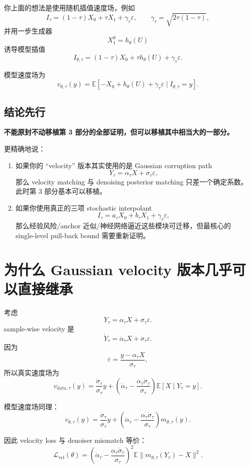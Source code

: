 \documentclass[UTF8,11pt]{ctexart}
\newcommand{\E}{\mathbb{E}}
\begin{document}
你上面的想法是使用随机插值速度场，例如
\[
I_\tau
=
(1-\tau)X_0+\tau X_1+\gamma_\tau\varepsilon,
\qquad
\gamma_\tau=\sqrt{2\tau(1-\tau)},
\]
并用一步生成器
\[
X_1^\theta=h_\theta(U)
\]
诱导模型插值
\[
I_{\theta,\tau}
=
(1-\tau)X_0+\tau h_\theta(U)+\gamma_\tau\varepsilon.
\]

模型速度场为
\[
v_{\theta,\tau}(y)
=
\E\left[
-X_0+h_\theta(U)+\dot\gamma_\tau\varepsilon
\mid I_{\theta,\tau}=y
\right].
\]

\subsection{结论先行}

\textbf{不能原封不动移植第 3 部分的全部证明，但可以移植其中相当大的一部分。}

更精确地说：
\begin{enumerate}
\item 如果你的 ``velocity'' 版本其实使用的是 Gaussian corruption path
\[
Y_\tau=\alpha_\tau X+\sigma_\tau\varepsilon,
\]
那么 velocity matching 与 denoising posterior matching 只差一个确定系数。此时第 3 部分基本可以移植。
\item 如果你使用真正的三项 stochastic interpolant
\[
I_\tau=a_\tau X_0+b_\tau X_1+\gamma_\tau\varepsilon,
\]
那么经验风险/anchor 近似/神经网络逼近这些模块可迁移，但最核心的 single-level pull-back bound 需要重新证明。
\end{enumerate}

\section{为什么 Gaussian velocity 版本几乎可以直接继承}

考虑
\[
Y_\tau=\alpha_\tau X+\sigma_\tau\varepsilon.
\]
sample-wise velocity 是
\[
\dot Y_\tau
=
\dot\alpha_\tau X+\dot\sigma_\tau\varepsilon.
\]
因为
\[
\varepsilon
=
\frac{y-\alpha_\tau X}{\sigma_\tau},
\]
所以真实速度场为
\[
v_{\mathrm{data},\tau}(y)
=
\frac{\dot\sigma_\tau}{\sigma_\tau}y
+
\left(
\dot\alpha_\tau
-
\frac{\alpha_\tau\dot\sigma_\tau}{\sigma_\tau}
\right)
\E[X\mid Y_\tau=y].
\]

模型速度场同理：
\[
v_{\theta,\tau}(y)
=
\frac{\dot\sigma_\tau}{\sigma_\tau}y
+
\left(
\dot\alpha_\tau
-
\frac{\alpha_\tau\dot\sigma_\tau}{\sigma_\tau}
\right)
m_{\theta,\tau}(y).
\]

因此 velocity loss 与 denoiser mismatch 等价：
\[
\mathcal L_{\mathrm{vel}}(\theta)
=
\left(
\dot\alpha_\tau
-
\frac{\alpha_\tau\dot\sigma_\tau}{\sigma_\tau}
\right)^2
\E\|m_{\theta,\tau}(Y_\tau)-X\|^2.
\]
\end{document}
